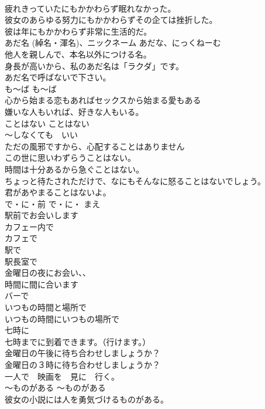 \documentclass[8pt]{extreport}
\begin{document}
\begin{CJK}{UTF8}{min}
\\	疲れきっていたにもかかわらず眠れなかった。   
\\	彼女のあらゆる努力にもかかわらずその企ては挫折した。   
\\	彼は年にもかかわらず非常に生活的だ。   
\\	あだ名 (綽名・渾名)、ニックネーム	あだな、にっくねーむ	
\\	他人を親しんで、本名以外につける名。	
\\	身長が高いから、私のあだ名は「ラクダ」です。   
\\	あだ名で呼ばないで下さい。   
\\	も〜ば	も〜ば	
\\	心から始まる恋もあればセックスから始まる愛もある  
\\	嫌いな人もいれば、好きな人もいる。  
\\	ことはない	ことはない	
\\	〜しなくても　いい	
\\	ただの風邪ですから、心配することはありません  
\\	この世に思いわずらうことはない。  
\\	時間は十分あるから急ぐことはない。  
\\	ちょっと待たされただけで、なにもそんなに怒ることはないでしょう。  
\\	君があやまることはないよ。  
\\	で・に・前	で・に・ まえ 
\\	駅前でお会いします   
\\	カフェー内で   
\\	カフェで   
\\	駅で  
\\	駅長室で  
\\	金曜日の夜にお会い、、   
\\	時間に間に合います   
\\	バーで   
\\	いつもの時間と場所で 
\\	いつもの時間にいつもの場所で  
\\	七時に   
\\	七時までに到着できます。（行けます。）   
\\	金曜日の午後に待ち合わせしましょうか？   
\\	金曜日の３時に待ち合わせしましょうか？   
\\	一人で　映画を　見に　行く。   
\\	〜ものがある	〜ものがある	
\\	彼女の小説には人を勇気づけるものがある。  

\end{CJK}
\end{document}
